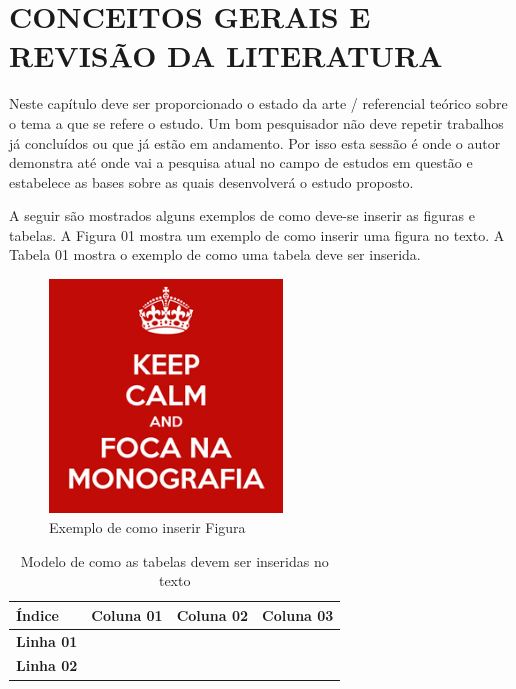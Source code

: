 \section{CONCEITOS GERAIS E REVISÃO DA LITERATURA}


Neste capítulo deve ser proporcionado o estado da arte / referencial teórico sobre o tema a que se refere o estudo. Um bom pesquisador não deve repetir trabalhos já concluídos ou que já estão em andamento. Por isso esta sessão é onde o autor demonstra até onde vai a pesquisa atual no campo de estudos em questão e estabelece as bases sobre as quais desenvolverá o estudo proposto. 

A seguir são mostrados alguns exemplos de como deve-se inserir as figuras e tabelas. A Figura 01 mostra um exemplo de como inserir uma figura no texto. A Tabela 01 mostra o exemplo de como uma tabela deve ser inserida.

\begin{figure}[h]
\centering
\includegraphics[height=6.2cm]{imagens/keep}
\caption{Exemplo de como inserir Figura}
\label{fig:exemplo}
\end{figure}

\begin{table}[h]
\centering
\caption{ Modelo de como as tabelas devem ser inseridas no texto }
\vspace{0.2in}
%
\newcommand{\rowstyle}[1]{%
  \protected\gdef\currentrowstyle{#1}%
}
\begin{tabularx}{\textwidth}{>{\bf}C|C|C|C}
\hline 
\textbf {Índice} & \textbf{Coluna 01} &\textbf{ Coluna 02} & \textbf{Coluna 03} \\ \hline \hline
Linha 01 & & & \\ \hline
Linha 02 & & & \\ \hline                         

\end{tabularx}
\end{table}
